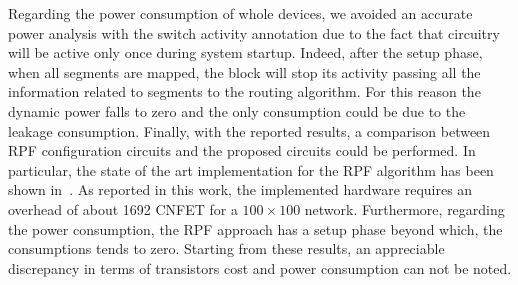 Regarding the power consumption of whole \disr{} devices, 
we avoided an accurate power analysis with the switch activity
annotation due to the fact that \disr{} circuitry will be active 
only once during system startup. Indeed, after the setup phase, 
when all segments are mapped, the \disr{} block will stop its activity 
passing all the information related to segments to the routing
algorithm. For this reason the dynamic power falls to zero and
the only consumption could be due to the leakage
consumption. Finally, with the reported results, a comparison between 
RPF configuration circuits and the proposed circuits could be performed.
In particular, the state of the art implementation for the RPF algorithm has been shown in~\cite{patwardhan_nanoarch06}. As reported in this work,  the implemented hardware requires an overhead of about 1692 CNFET for a $100 \times 100$ network. Furthermore, regarding the power consumption, the RPF approach has a setup phase beyond which, the consumptions tends to zero. Starting from these results, an appreciable discrepancy in terms of transistors cost and power consumption can not be noted.
